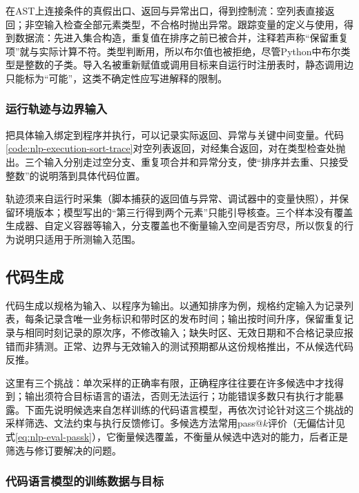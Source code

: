 在AST上连接条件的真假出口、返回与异常出口，得到控制流：空列表直接返回；非空输入检查全部元素类型，不合格时抛出异常。跟踪变量的定义与使用，得到数据流：先进入集合构造，重复值在排序之前已被合并，注释若声称“保留重复项”就与实际计算不符。类型判断用，所以布尔值也被拒绝，尽管Python中布尔类型是整数的子类。导入名被重新赋值或调用目标来自运行时注册表时，静态调用边只能标为“可能”，这类不确定性应写进解释的限制。

\subsubsection{运行轨迹与边界输入}
\label{sec:nlp-execution-traces}

把具体输入绑定到程序并执行，可以记录实际返回、异常与关键中间变量。代码\ref{code:nlp-execution-sort-trace}对空列表返回\code{[]}，对\code{[3,1,3]}经集合返回\code{[1,3]}，对\code{[1,"2"]}在类型检查处抛出。三个输入分别走过空分支、重复项合并和异常分支，使“排序并去重、只接受整数”的说明落到具体代码位置。

轨迹须来自运行时采集（脚本捕获的返回值与异常、调试器中的变量快照），并保留环境版本；模型写出的“第三行得到两个元素”只能引导核查。三个样本没有覆盖生成器、自定义容器等输入，分支覆盖也不衡量输入空间是否穷尽，所以恢复的行为说明只适用于所测输入范围。

\subsection{代码生成}
\label{sec:nlp-execution-generation}

代码生成以规格为输入、以程序为输出。以通知排序为例，规格约定输入为记录列表，每条记录含唯一业务标识和带时区的发布时间；输出按时间升序，保留重复记录与相同时刻记录的原次序，不修改输入；缺失时区、无效日期和不合格记录应报错而非猜测。正常、边界与无效输入的测试预期都从这份规格推出，不从候选代码反推。

这里有三个挑战：单次采样的正确率有限，正确程序往往要在许多候选中才找得到；输出须符合目标语言的语法，否则无法运行；功能错误多数只有执行才能暴露。下面先说明候选来自怎样训练的代码语言模型，再依次讨论针对这三个挑战的采样筛选、文法约束与执行反馈修订。多候选方法常用pass@$k$评价（无偏估计见式\eqref{eq:nlp-eval-passk}），它衡量候选覆盖，不衡量从候选中选对的能力，后者正是筛选与修订要解决的问题。

\subsubsection{代码语言模型的训练数据与目标}
\label{sec:nlp-execution-code-lm}

